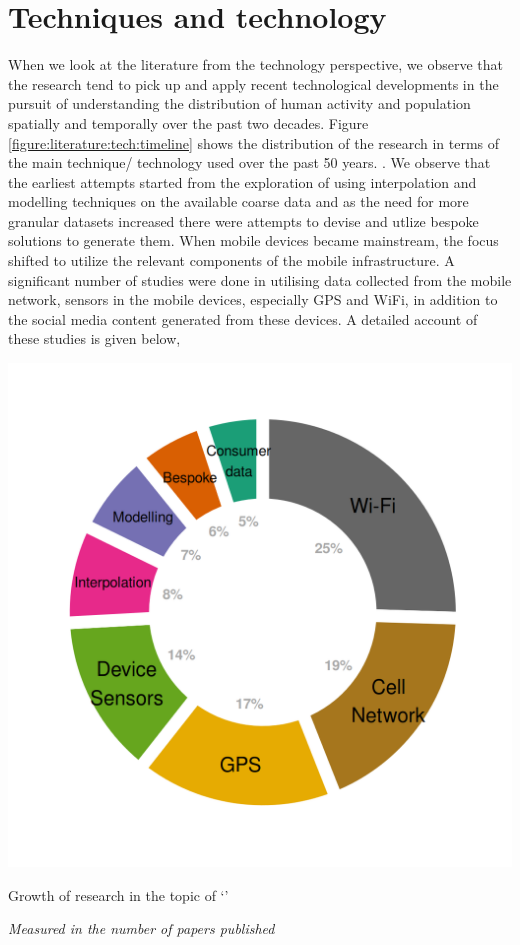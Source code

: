\section{Techniques and technology}

When we look at the literature from the technology perspective, we observe that the research tend to pick up and apply recent technological developments in the pursuit of understanding the distribution of human activity and population spatially and temporally over the past two decades.
Figure \ref{figure:literature:tech:timeline} shows the distribution of the research in terms of the main technique/ technology used over the past 50 years.
. We observe that the earliest attempts started from the exploration of using interpolation and modelling techniques on the available coarse data and as the need for more granular datasets increased there were attempts to devise and utlize bespoke solutions to generate them.
When mobile devices became mainstream, the focus shifted to utilize the relevant components of the mobile infrastructure.
A significant number of studies were done in utilising data collected from the mobile network, sensors in the mobile devices, especially GPS and WiFi, in addition to the social media content generated from these devices.
A detailed account of these studies is given below,

\begin{marginfigure}[-7.5cm]
  \includegraphics[trim={1.1cm 1cm 1cm 1cm},clip]{images/literature-technology.png}
  \caption{Growth of research in the topic of `'}
  \label{figure:literature:timeline}
  \noindent\fontsize{7}{7}\textit{Measured in the number of papers published}
\end{marginfigure}


